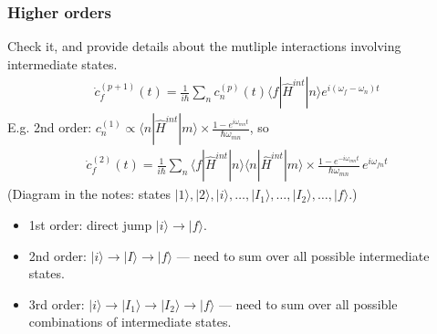 \documentclass[letterpaper,10pt,english]{jupyterBook}
\begin{document}
\subsubsection{Higher orders}
\label{\detokenize{ch/quantum-mechanics/qft/interactions-perturbation:higher-orders}}
\sphinxAtStartPar
Check it, and provide details about the mutliple interactions involving intermediate states.
\begin{equation*}
\begin{split}
\dot c_f^{(p+1)}(t)=\frac1{i\hbar}\sum_nc_n^{(p)}(t)\langle f|\hat H^{int}|n\rangle e^{i(\omega_f-\omega_n)t}
\end{split}
\end{equation*}
\sphinxAtStartPar
E.g. 2nd order: \(c_n^{(1)}\propto\langle n|\hat H^{int}|m\rangle\times\frac{1-e^{i\omega_{mn}t}}{\hbar\omega_{mn}}\), so
\begin{equation*}
\begin{split}
\dot c_f^{(2)}(t)=\frac1{i\hbar}\sum_n\langle f|\hat H^{int}|n\rangle\langle n|\hat H^{int}|m\rangle\times\frac{1-e^{-i\omega_{mn}t}}{\hbar\omega_{mn}}\,e^{i\omega_{fn}t}
\end{split}
\end{equation*}
\sphinxAtStartPar
(Diagram in the notes: states \(|1\rangle,|2\rangle,|i\rangle,\dots,|I_1\rangle,\dots,|I_2\rangle,\dots,|f\rangle\).)
\begin{itemize}
\item {} 
\sphinxAtStartPar
1st order: direct jump \(|i\rangle\to|f\rangle\).

\item {} 
\sphinxAtStartPar
2nd order: \(|i\rangle\to|I\rangle\to|f\rangle\) — need to sum over all possible intermediate states.

\item {} 
\sphinxAtStartPar
3rd order: \(|i\rangle\to|I_1\rangle\to|I_2\rangle\to|f\rangle\) — need to sum over all possible combinations of intermediate states.

\end{itemize}

\sphinxstepscope
\end{document}
